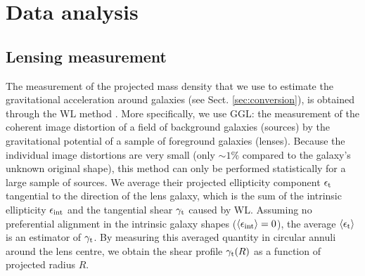 \documentclass[usenatbib]{mnras}
\newcommand{\lan}{\langle}
\newcommand{\ran}{\rangle}
\newcommand{\un}[1]{_{\rm #1}}
\begin{document}

\section{Data analysis}
\label{sec:analysis}

\subsection{Lensing measurement}
\label{sec:lensing}

The measurement of the projected mass density that we use to estimate the gravitational acceleration around galaxies (see Sect. \ref{sec:conversion}), is obtained through the WL method \cite[for a general introduction, see][]{bartelmann2001,schneider2006}. More specifically, we use GGL: the measurement of the coherent image distortion of a field of background galaxies (sources) by the gravitational potential of a sample of foreground galaxies (lenses). Because the individual image distortions are very small (only $\sim1\%$ compared to the galaxy's unknown original shape), this method can only be performed statistically for a large sample of sources. We average their projected ellipticity component $\epsilon\un{t}$ tangential to the direction of the lens galaxy, which is the sum of the intrinsic ellipticity $\epsilon\un{int}$ and the tangential shear $\gamma\un{t}$ caused by WL. Assuming no preferential alignment in the intrinsic galaxy shapes ($\lan\epsilon\un{int}\ran=0$), the average $\lan\epsilon\un{t}\ran$ is an estimator of $\gamma\un{t}$. By measuring this averaged quantity in circular annuli around the lens centre, we obtain the shear profile $\gamma\un{t}(R)$ as a function of projected radius $R$.
\end{document}
